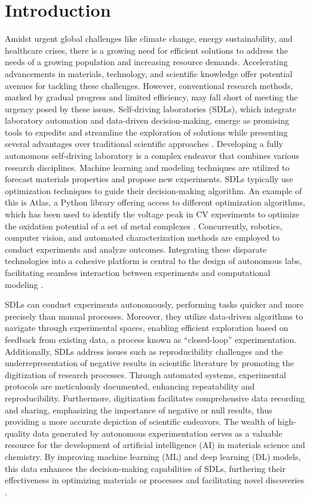 \chapter{Introduction} \label{introduction}
Amidst urgent global challenges like climate change, energy sustainability, and healthcare crises, there is a growing need for efficient solutions to address the needs of a growing population and increasing resource demands. Accelerating advancements in materials, technology, and scientific knowledge offer potential avenues for tackling these challenges. However, conventional research methods, marked by gradual progress and limited efficiency, may fall short of meeting the urgency posed by these issues. Self-driving laboratories (SDLs), which integrate laboratory automation and data-driven decision-making, emerge as promising tools to expedite and streamline the exploration of solutions while presenting several advantages over traditional scientific approaches \cite{Tom2024}. Developing a fully autonomous self-driving laboratory is a complex endeavor that combines various research disciplines. Machine learning and modeling techniques are utilized to forecast materials properties and propose new experiments. SDLs typically use optimization techniques to guide their decision-making algorithm. An example of this is Atlas, a Python library offering access to different optimization algorithms, which has been used to identify the voltage peak in CV experiments to optimize the oxidation potential of a set of metal complexes \cite{Hickman2023}. Concurrently, robotics, computer vision, and automated characterization methods are employed to conduct experiments and analyze outcomes.  Integrating these disparate technologies into a cohesive platform is central to the design of autonomous labs, facilitating seamless interaction between experiments and computational modeling \cite{StriethKalthoff2023}. 

SDLs can conduct experiments autonomously, performing tasks quicker and more precisely than manual processes. Moreover, they utilize data-driven algorithms to navigate through experimental spaces, enabling efficient exploration based on feedback from existing data, a process known as \enquote{closed-loop} experimentation. Additionally, SDLs address issues such as reproducibility challenges and the underrepresentation of negative results in scientific literature by promoting the digitization of research processes. Through automated systems, experimental protocols are meticulously documented, enhancing repeatability and reproducibility. Furthermore, digitization facilitates comprehensive data recording and sharing, emphasizing the importance of negative or null results, thus providing a more accurate depiction of scientific endeavors. The wealth of high-quality data generated by autonomous experimentation serves as a valuable resource for the development of artificial intelligence (AI) in materials science and chemistry. By improving machine learning (ML) and deep learning (DL) models, this data enhances the decision-making capabilities of SDLs, furthering their effectiveness in optimizing materials or processes and facilitating novel discoveries \cite{Tom2024}.

